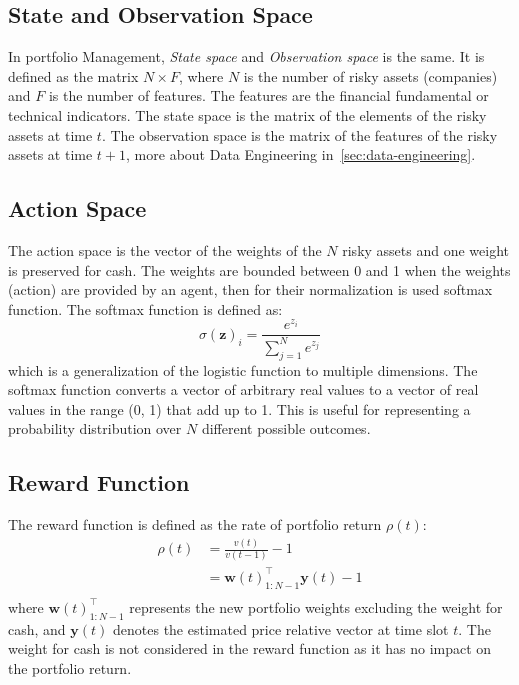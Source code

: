 \documentclass[../xlapes02]{subfiles}
\begin{document}
    \subsection{State and Observation Space}\label{subsec:state-space}
    In portfolio Management, \emph{State space} and \emph{Observation space} is the same. It is defined as the matrix $N\times F$, where $N$ is the number of risky assets (companies) and $F$ is the number of features. The features are the financial fundamental or technical indicators. The state space is the matrix of the elements of the risky assets at time $t$. The observation space is the matrix of the features of the risky assets at time $t+1$, more about Data Engineering in~\cref{sec:data-engineering}.

    \subsection{Action Space}\label{subsec:action-space}
    The action space is the vector of the weights of the $N$ risky assets and one weight is preserved for cash. The weights are bounded between 0 and 1 when the weights (action) are provided by an agent, then for their normalization is used softmax function. The softmax function is defined as:
    \begin{equation}
        \sigma(\mathbf{z})_i=\frac{e^{z_i}}{\sum_{j=1}^{N}e^{z_j}}
    \end{equation}
    which is a generalization of the logistic function to multiple dimensions. The softmax function converts a vector of arbitrary real values to a vector of real values in the range (0, 1) that add up to 1. This is useful for representing a probability distribution over $N$ different possible outcomes.

    \subsection{Reward Function}\label{subsec:reward-function}
    The reward function is defined as the rate of portfolio return $\rho(t)$:
    \begin{equation}
        \begin{split}
            \rho(t)&=\frac{v(t)}{v(t-1)}-1\\
            &=\mathbf{w}(t)_{1:N-1}^\top\mathbf{y}(t)-1\\
        \end{split}
    \end{equation}
    where $\mathbf{w}(t)_{1:N-1}^\top$ represents the new portfolio weights excluding the weight for cash, and $\mathbf{y}(t)$ denotes the estimated price relative vector at time slot $t$. The weight for cash is not considered in the reward function as it has no impact on the portfolio return.
\end{document}
